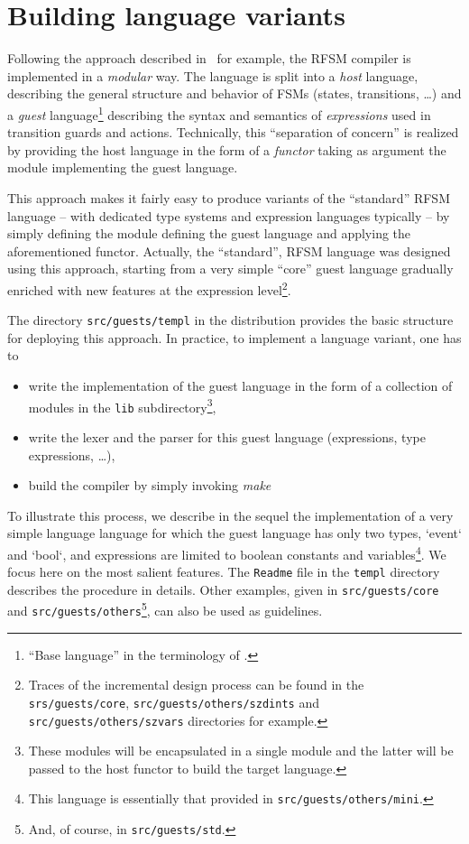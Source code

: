 \chapter{ Building language variants}
\label{cha:variants}

Following the approach described in~\cite{Leroy00} for example, the RFSM compiler is implemented in
a \emph{modular} way. The language is split into a \emph{host} language, describing the general
structure and behavior of FSMs (states, transitions, \ldots) and a \emph{guest}
language\footnote{``Base language'' in the terminology of \cite{Leroy00}.} describing the syntax and
semantics of \emph{expressions} used in transition guards and actions. 
Technically, this ``separation of concern'' is realized by providing the host language in the form
of a \emph{functor} taking as argument the module implementing the guest language.

This approach makes it fairly easy to produce variants of the ``standard'' RFSM language -- with
dedicated type systems and expression languages typically -- by simply defining the module defining
the guest language and applying the aforementioned functor. Actually, the ``standard'', RFSM
  language was designed using this approach, starting from a very simple ``core'' guest
  language gradually enriched with new features at the expression level\footnote{Traces of the
    incremental design process can be found in the \texttt{srs/guests/core},
    \texttt{src/guests/others/szdints} and \texttt{src/guests/others/szvars} directories for example.}. 

The directory \verb|src/guests/templ| in the distribution provides the basic structure for deploying
this approach. In practice, to implement a language variant, one has to
\begin{itemize}
\item write the implementation of the guest language in the form of a collection of modules in the
  \texttt{lib} subdirectory\footnote{These modules will be encapsulated in a single module and the
    latter will be passed to the host functor to build the target language.},
\item write the lexer and the parser for this guest language (expressions, type expressions, \ldots),
\item build the compiler by simply invoking \emph{make}  
\end{itemize}

\medskip
To illustrate this process, we describe in the sequel the implementation of a very simple language
language for which the guest language has only two types, `event` and `bool`,
and expressions are limited to boolean constants and variables\footnote{This language is essentially
  that provided in \texttt{src/guests/others/mini}.}. We focus here on the most salient features. 
The \texttt{Readme} file in the  \texttt{templ} directory describes the procedure in
details. Other examples, given in \verb|src/guests/core| and \verb|src/guests/others|\footnote{And, of
  course, in \texttt{src/guests/std}.}, can also be used as guidelines. 

